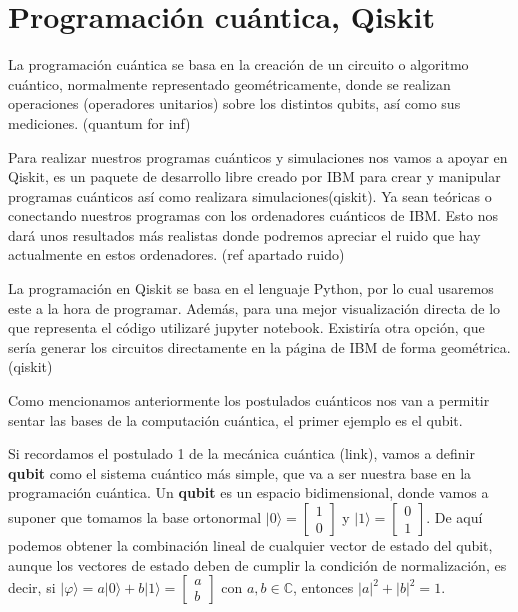 \section{Programación cuántica, Qiskit}
 La programación cuántica se basa en la creación de un circuito o algoritmo cuántico, normalmente representado geométricamente, donde se realizan operaciones (operadores unitarios) sobre los distintos qubits, así como sus mediciones. (quantum for inf)\newline

 Para realizar nuestros programas cuánticos y simulaciones nos vamos a apoyar en Qiskit, es un paquete de desarrollo libre creado por IBM para crear y manipular programas cuánticos así como realizara simulaciones(qiskit). Ya sean teóricas o conectando nuestros programas con los ordenadores cuánticos de IBM. Esto nos dará unos resultados más realistas donde podremos apreciar el ruido que hay actualmente en estos ordenadores. (ref apartado ruido) \newline
 
 La programación en Qiskit se basa en el lenguaje Python, por lo cual usaremos este a la hora de programar. Además, para una mejor visualización directa de lo que representa el código utilizaré jupyter notebook. Existiría otra opción, que sería generar los circuitos directamente en la página de IBM de forma geométrica.(qiskit) \newline
 
 Como mencionamos anteriormente los postulados cuánticos nos van a permitir sentar las bases de la computación cuántica, el primer ejemplo es el qubit. \newline
 
 Si recordamos el postulado 1 de la mecánica cuántica (link), vamos a definir \textbf{qubit} como el sistema cuántico más simple, que va a ser nuestra base en la programación cuántica. Un \textbf{qubit} es un espacio bidimensional, donde vamos a suponer que tomamos la base ortonormal $|0 \rangle = \begin{bmatrix} 1\\0 \end{bmatrix}$ y $|1 \rangle = \begin{bmatrix} 0\\1 \end{bmatrix}$. De aquí podemos obtener la combinación lineal de cualquier vector de estado del qubit, aunque los vectores de estado deben de cumplir la condición de normalización, es decir, si $|\varphi \rangle = a |0\rangle + b |1\rangle = \begin{bmatrix} a\\b \end{bmatrix}$ con $a,b \in \mathbb{C}$, entonces $|a|^{2}+|b|^{2}=1$.\newline

